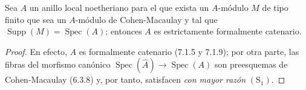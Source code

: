 
\begin{corollary}[7.2.7]
\label{IV.2.s7.2.7-fr}
Sea $A$ un anillo local noetheriano para el que exista un $A$-módulo $M$
de tipo finito que sea un $A$-módulo de Cohen-Macaulay y tal que
$\operatorname{Supp}(M)=\operatorname{Spec}(A)$; entonces $A$ es
estrictamente formalmente catenario.
\end{corollary}

\begin{proof}
En efecto, $A$ es formalmente catenario (7.1.5 y 7.1.9); por otra parte,
las fibras del morfismo canónico
$\operatorname{Spec}(\widehat A)\to\operatorname{Spec}(A)$ son
preesquemas de Cohen-Macaulay (6.3.8) y, por tanto, satisfacen \emph{con
mayor razón} $(\mathrm S_1)$.
\end{proof}
